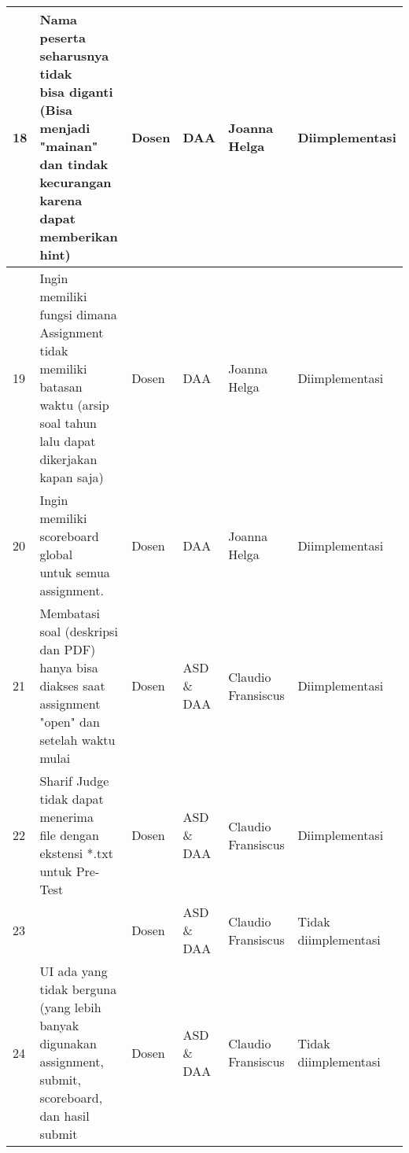\begin{table}[H]
{\begin{tabular}{|l|l|l|l|l|l|}
		18 & \makecell[l]{Nama peserta seharusnya tidak \\ bisa diganti (Bisa menjadi \\ "mainan" dan tindak kecurangan \\ karena dapat memberikan hint)} & Dosen & DAA & Joanna Helga & Diimplementasi\\ \hline
		19 & \makecell[l]{Ingin memiliki fungsi dimana \\ Assignment tidak memiliki batasan \\ waktu (arsip soal tahun \\ lalu dapat dikerjakan kapan saja)} & Dosen & DAA & Joanna Helga & Diimplementasi\\ \hline
		20 & \makecell[l]{Ingin memiliki scoreboard global \\ untuk semua assignment.} & Dosen & DAA & Joanna Helga & Diimplementasi\\ \hline
		21 & \makecell[l]{Membatasi soal (deskripsi dan PDF) \\ hanya bisa diakses saat assignment \\ "open" dan setelah waktu mulai} & Dosen & ASD \& DAA & Claudio Fransiscus & Diimplementasi\\ \hline
		22 & \makecell[l]{Sharif Judge tidak dapat menerima \\ file dengan ekstensi *.txt \\ untuk Pre-Test} & Dosen & ASD \& DAA & Claudio Fransiscus & Diimplementasi\\ \hline
		23 & \makecell[l]{UI masih merepotkan} & Dosen & ASD \& DAA & Claudio Fransiscus & Tidak diimplementasi\\ \hline
		24 & \makecell[l]{UI ada yang tidak berguna \\ (yang lebih banyak digunakan \\ assignment, submit, scoreboard, \\ dan hasil submit} & Dosen & ASD \& DAA & Claudio Fransiscus & Tidak diimplementasi\\

		\bottomrule
		
	\end{tabular}}
\end{table}

